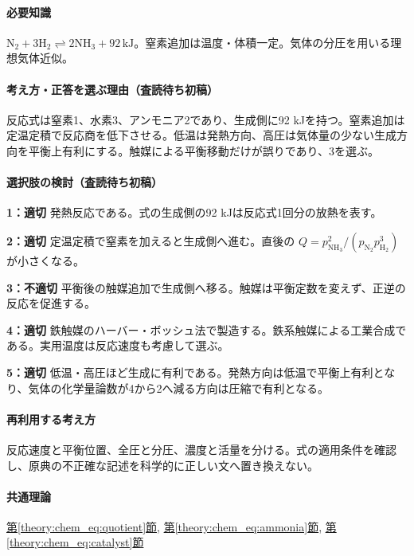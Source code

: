 \paragraph{必要知識} \(\mathrm{N_2+3H_2\rightleftharpoons2NH_3}+92\,\mathrm{kJ}\)。窒素追加は温度・体積一定。気体の分圧を用いる理想気体近似。

\paragraph{考え方・正答を選ぶ理由（査読待ち初稿）} 反応式は窒素1、水素3、アンモニア2であり、生成側に92 kJを持つ。窒素追加は定温定積で反応商を低下させる。低温は発熱方向、高圧は気体量の少ない生成方向を平衡上有利にする。触媒による平衡移動だけが誤りであり、3を選ぶ。

\paragraph{選択肢の検討（査読待ち初稿）}\mbox{}\par

\noindent\textbf{1：適切} 発熱反応である。式の生成側の92 kJは反応式1回分の放熱を表す。\par

\noindent\textbf{2：適切} 定温定積で窒素を加えると生成側へ進む。直後の \(Q=p_{\mathrm{NH_3}}^2/(p_{\mathrm{N_2}}p_{\mathrm{H_2}}^3)\) が小さくなる。\par

\noindent\textbf{3：不適切} 平衡後の触媒追加で生成側へ移る。触媒は平衡定数を変えず、正逆の反応を促進する。\par

\noindent\textbf{4：適切} 鉄触媒のハーバー・ボッシュ法で製造する。鉄系触媒による工業合成である。実用温度は反応速度も考慮して選ぶ。\par

\noindent\textbf{5：適切} 低温・高圧ほど生成に有利である。発熱方向は低温で平衡上有利となり、気体の化学量論数が4から2へ減る方向は圧縮で有利となる。\par

\paragraph{再利用する考え方} 反応速度と平衡位置、全圧と分圧、濃度と活量を分ける。式の適用条件を確認し、原典の不正確な記述を科学的に正しい文へ置き換えない。

\paragraph{共通理論} \hyperref[theory:chem_eq:quotient]{第\ref*{theory:chem_eq:quotient}節}, \hyperref[theory:chem_eq:ammonia]{第\ref*{theory:chem_eq:ammonia}節}, \hyperref[theory:chem_eq:catalyst]{第\ref*{theory:chem_eq:catalyst}節}

